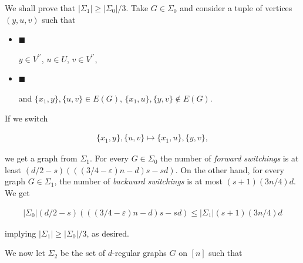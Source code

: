 \documentclass[10pt,a4paper]{article}
\begin{document}
We shall prove that $|\Sigma_{1}|\geq|\Sigma_{0}|/3$.
Take $G\in\Sigma_{0}$ and consider a tuple of vertices $(y,u,v)$ such that\par


\begin{itemize}


\item[] 
$\blacksquare$ 


$y\in V^{\prime\prime}$, $u\in U$, $v\in V^{\prime\prime}$,\par





\item[] 
$\blacksquare$ 


and $\{x_{1},y\},\{u,v\}\in E(G)$, $\{x_{1},u\},\{y,v\}\notin E(G)$.\par





\end{itemize}


If we switch\par


\[\begin{gathered}
\{x_{1},y\},\{u,v\}\mapsto\{x_{1},u\},\{y,v\},
\end{gathered}\]


we get a graph from $\Sigma_{1}$. For every $G\in\Sigma_{0}$ the number of \emph{forward switchings} is at least $(d/2-s)(((3/4-\varepsilon)n-d)s-sd)$. On the other hand, for every graph $G\in\Sigma_{1}$, the number of \emph{backward switchings} is at most $(s+1)(3n/4)d$. We get\par


\[\begin{gathered}
|\Sigma_{0}|(d/2-s)(((3/4-\varepsilon)n-d)s-sd)\leq|\Sigma_{1}|(s+1)(3n/4)d
\end{gathered}\]


implying $|\Sigma_{1}|\geq|\Sigma_{0}|/3$, as desired.\par




We now let $\Sigma_{2}$ be the set of $d$-regular graphs $G$ on $[n]$ such that\par
\end{document}
